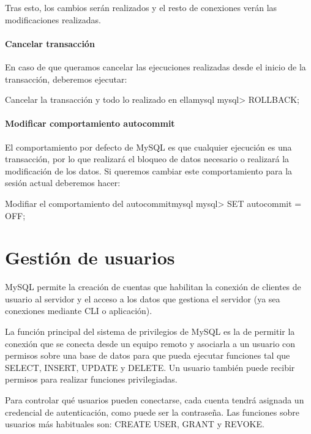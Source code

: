 Tras esto, los cambios serán realizados y el resto de conexiones verán las modificaciones realizadas.


\subsubsection*{Cancelar transacción}

En caso de que queramos cancelar las ejecuciones realizadas desde el inicio de la transacción, deberemos ejecutar:

\begin{mycode}{Cancelar la transacción y todo lo realizado en ella}{mysql}{}
mysql> ROLLBACK;
\end{mycode}


\subsubsection*{Modificar comportamiento autocommit}
El comportamiento por defecto de MySQL es que cualquier ejecución es una transacción, por lo que realizará el bloqueo de datos necesario o realizará la modificación de los datos. Si queremos cambiar este comportamiento para la sesión actual deberemos hacer:

\begin{mycode}{Modifiar el comportamiento del autocommit}{mysql}{}
mysql> SET autocommit = OFF;
\end{mycode}



\chapter{Gestión de usuarios}

MySQL permite la creación de cuentas que habilitan la conexión de clientes de usuario al servidor y el acceso a los datos que gestiona el servidor (ya sea conexiones mediante CLI o aplicación).

La función principal del sistema de privilegios de MySQL es la de permitir la conexión que se conecta desde un equipo remoto y asociarla a un usuario con permisos sobre una base de datos para que pueda ejecutar funciones tal que  SELECT, INSERT, UPDATE y DELETE. Un usuario también puede recibir permisos para realizar funciones privilegiadas.

Para controlar qué usuarios pueden conectarse, cada cuenta tendrá asignada un credencial de autenticación, como puede ser la contraseña. Las funciones sobre usuarios más habituales son: CREATE USER, GRANT y REVOKE.

